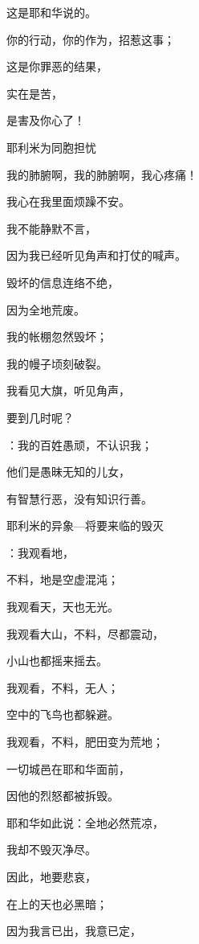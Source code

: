 {\par }{\Q 这是耶和华说的。
\par }{\Q {}你的行动，你的作为，招惹这事；
\par }{\Q 这是你罪恶的结果，
\par }{\Q 实在是苦，
\par }{\Q 是害及你心了！
\par }{\SH 耶利米为同胞担忧
\par }{\Q {}我的肺腑啊，我的肺腑啊，我心疼痛！
\par }{\Q 我心在我里面烦躁不安。
\par }{\Q 我不能静默不言，
\par }{\Q 因为我已经听见角声和打仗的喊声。
\par }{\Q {}毁坏的信息连络不绝，
\par }{\Q 因为全地荒废。
\par }{\Q 我的帐棚忽然毁坏；
\par }{\Q 我的幔子顷刻破裂。
\par }{\Q {}我看见大旗，听见角声，
\par }{\Q 要到几时呢？
\par }{\Q {}：我的百姓愚顽，不认识我；
\par }{\Q 他们是愚昧无知的儿女，
\par }{\Q 有智慧行恶，没有知识行善。
\par }{\SH 耶利米的异象—将要来临的毁灭
\par }{\Q {}：我观看地，
\par }{\Q 不料，地是空虚混沌；
\par }{\Q 我观看天，天也无光。
\par }{\Q {}我观看大山，不料，尽都震动，
\par }{\Q 小山也都摇来摇去。
\par }{\Q {}我观看，不料，无人；
\par }{\Q 空中的飞鸟也都躲避。
\par }{\Q {}我观看，不料，肥田变为荒地；
\par }{\Q 一切城邑在耶和华面前，
\par }{\Q 因他的烈怒都被拆毁。
\par }{\Q {}耶和华如此说：全地必然荒凉，
\par }{\Q 我却不毁灭净尽。
\par }{\Q {}因此，地要悲哀，
\par }{\Q 在上的天也必黑暗；
\par }{\Q 因为我言已出，我意已定，
}
